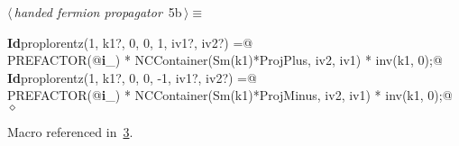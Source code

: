 \documentclass[a4paper,12pt]{amsart}
\renewcommand{\NWtarget}[2]{\hypertarget{#1}{#2}}
\renewcommand{\NWlink}[2]{\hyperlink{#1}{#2}}
\renewcommand{\NWtxtMacroRefIn}{Macro referenced in}
\renewcommand{\NWsep}{${\diamond}$}
\begin{document}
\begin{flushleft} \small
\begin{minipage}{\linewidth}\label{scrap7}\raggedright\small
\NWtarget{nuweb5b}{} $\langle\,${\itshape handed fermion propagator}\nobreak\ {\footnotesize {5b}}$\,\rangle\equiv$
\vspace{-1ex}
\begin{list}{}{} \item
\mbox{}\verb@@\hbox{\sffamily\bfseries Id}\verb@ proplorentz(1, k1?, 0, 0, 1, iv1?, iv2?) =@\\
\mbox{}\verb@  PREFACTOR(@\hbox{\sffamily\bfseries i}\verb@_) * NCContainer(Sm(k1)*ProjPlus, iv2, iv1) * inv(k1, 0);@\\
\mbox{}\verb@@\hbox{\sffamily\bfseries Id}\verb@ proplorentz(1, k1?, 0, 0, -1, iv1?, iv2?) =@\\
\mbox{}\verb@  PREFACTOR(@\hbox{\sffamily\bfseries i}\verb@_) * NCContainer(Sm(k1)*ProjMinus, iv2, iv1) * inv(k1, 0);@{\NWsep}
\end{list}
\vspace{-1.5ex}
\footnotesize
\begin{list}{}{\setlength{\itemsep}{-\parsep}\setlength{\itemindent}{-\leftmargin}}
\item \NWtxtMacroRefIn\ \NWlink{nuweb3}{3}.

\item{}
\end{list}
\end{minipage}\vspace{4ex}
\end{flushleft}
\end{document}

